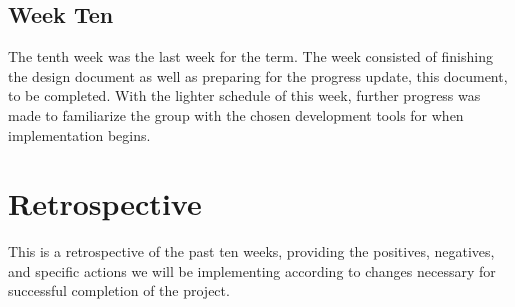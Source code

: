 \documentclass[onecolumn, draftclsnofoot,10pt, compsoc]{IEEEtran}
\begin{document}
\subsection{Week Ten}
The tenth week was the last week for the term.
The week consisted of finishing the design document as well as preparing for the progress update, this document, to be completed.
With the lighter schedule of this week, further progress was made to familiarize the group with the chosen development tools for when implementation begins.\par
\newpage
\section{Retrospective}
This is a retrospective of the past ten weeks, providing the positives, negatives, and specific actions we will be implementing according to changes necessary for successful completion of the project.\par
\end{document}
